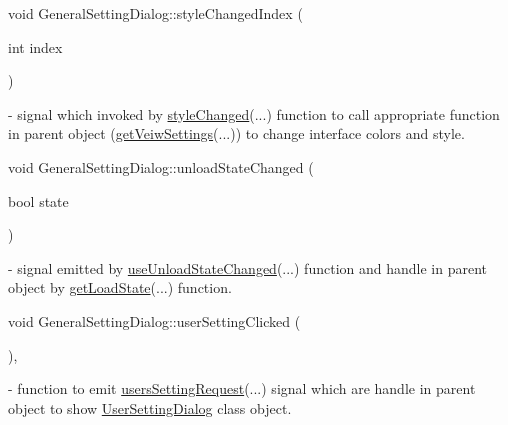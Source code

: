 \mbox{\label{classGeneralSettingDialog_ab651d47f726e1049c0bf34e6ebcb8cf1}} 
{\footnotesize\ttfamily void General\+Setting\+Dialog\+::\texorpdfstring{style\+Changed\+Index}{styleChangedIndex} (\begin{DoxyParamCaption}\item[{int}]{index }\end{DoxyParamCaption}){\ttfamily [signal]}}  - signal which invoked by \hyperlink{classGeneralSettingDialog_ac250bc3aba6c2e247d26f5ece4b32af7}{style\+Changed}(...) function to call appropriate function in parent object (\hyperlink{classMainWindow_ace96362adad45fba8ba98fa834ddb7f2}{get\+Veiw\+Settings}(...)) to change interface colors and style.

\mbox{\label{classGeneralSettingDialog_a3ec05b9d5bf741008ba575d408af6c04}} 
{\footnotesize\ttfamily void General\+Setting\+Dialog\+::\texorpdfstring{unload\+State\+Changed}{unloadStateChanged} (\begin{DoxyParamCaption}\item[{bool}]{state }\end{DoxyParamCaption}){\ttfamily [signal]}} - signal emitted by \hyperlink{classGeneralSettingDialog_acfb5eb53ac65d1aa5f037e88d91fa7e8}{use\+Unload\+State\+Changed}(...) function and handle in parent object by \hyperlink{classMainWindow_a7c2d999fc817728b31dccaaa1e72bd43}{get\+Load\+State}(...) function.

\mbox{\label{classGeneralSettingDialog_abfa33957c880ab0172b2ee30e848f6bd}} 
{\footnotesize\ttfamily void General\+Setting\+Dialog\+::\texorpdfstring{user\+Setting\+Clicked}{userSettingClicked} (\begin{DoxyParamCaption}{ }\end{DoxyParamCaption}){\ttfamily [private]}, {\ttfamily [slot]}} - function to emit \hyperlink{classGeneralSettingDialog_a9bc417a43ff037b30e281e38fbc98744}{users\+Setting\+Request}(...) signal which are handle in parent object to show \hyperlink{classUserSettingDialog}{User\+Setting\+Dialog} class object.

